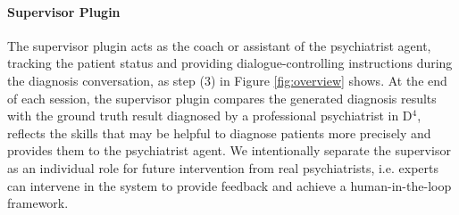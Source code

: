 \paragraph{Supervisor Plugin}
The supervisor plugin acts as the coach or assistant of the psychiatrist agent, tracking the patient status and providing dialogue-controlling instructions during the diagnosis conversation, as step (3) in Figure \ref{fig:overview} shows. At the end of each session, the supervisor plugin compares the generated diagnosis results with the ground truth result diagnosed by a professional psychiatrist in D$^4$, reflects the skills that may be helpful to diagnose patients more precisely and provides them to the psychiatrist agent. We intentionally separate the supervisor as an individual role for future intervention from real psychiatrists, i.e. experts can intervene in the system to provide feedback and achieve a human-in-the-loop framework.
